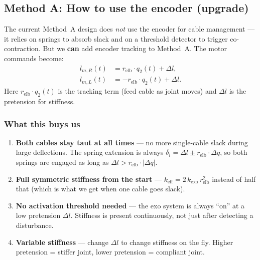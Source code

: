 \documentclass[11pt, a4paper]{article}
\begin{document}
\subsection{Method A: How to use the encoder (upgrade)}
\label{sec:encoder-A}

The current Method~A design does \emph{not} use the encoder for cable
management --- it relies on springs to absorb slack and on a threshold
detector to trigger co-contraction.  But we \textbf{can} add encoder
tracking to Method~A.  The motor commands become:
%
\begin{align}\label{eq:encoder-A}
    l_{m,R}(t) &= r_{\text{elb}} \cdot q_2(t) + \Delta l, \\
    l_{m,L}(t) &= -r_{\text{elb}} \cdot q_2(t) + \Delta l.
\end{align}
%
Here $r_{\text{elb}} \cdot q_2(t)$ is the tracking term (feed cable as joint
moves) and $\Delta l$ is the pretension for stiffness.

\subsubsection{What this buys us}

\begin{enumerate}
    \item \textbf{Both cables stay taut at all times} --- no more single-cable
        slack during large deflections.  The spring extension is always
        $\delta_i = \Delta l \pm r_{\text{elb}} \cdot \Delta q$, so both
        springs are engaged as long as
        $\Delta l > r_{\text{elb}} \cdot |\Delta q|$.

    \item \textbf{Full symmetric stiffness from the start} ---
        $k_{\text{eff}} = 2\,k_{\text{exo}}\,r_{\text{elb}}^2$ instead of
        half that (which is what we get when one cable goes slack).

    \item \textbf{No activation threshold needed} --- the exo system is
        always ``on'' at a low pretension $\Delta l$.  Stiffness is present
        continuously, not just after detecting a disturbance.

    \item \textbf{Variable stiffness} --- change $\Delta l$ to change
        stiffness on the fly.  Higher pretension = stiffer joint, lower
        pretension = compliant joint.
\end{enumerate}
\end{document}
